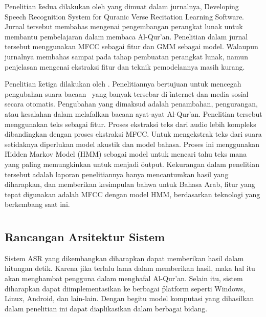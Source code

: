 Penelitian \f{kedua} dilakukan oleh \cite{putra2012developing} yang dimuat dalam jurnalnya, \f{Developing Speech Recognition System for Quranic Verse Recitation Learning Software}. Jurnal tersebut membahas mengenai pengembangan perangkat lunak untuk membantu pembelajaran dalam membaca Al-Qur'an. Penelitian dalam jurnal tersebut menggunakan MFCC sebagai fitur dan GMM sebagai model. Walaupun jurnalnya membahas sampai pada tahap pembuatan perangkat lunak, namun penjelasan mengenai ekstraksi fitur dan teknik pemodelannya masih kurang.

Penelitian \f{ketiga} dilakukan oleh \cite{mohammed2015quranic}. Penelitiannya bertujuan untuk mencegah pengubahan suara bacaan \quran~yang banyak tersebar di \f{internet} dan media sosial secara otomatis. Pengubahan yang dimaksud adalah penambahan, pengurangan, atau kesalahan dalam melafalkan bacaan ayat-ayat Al-Qur'an. Penelitian tersebut menggunakan teks sebagai fitur. Proses ekstraksi teks dari audio lebih kompleks dibandingkan dengan proses ekstraksi MFCC. Untuk mengekstrak teks dari suara setidaknya diperlukan model akustik dan model bahasa. Proses ini menggunakan \f{Hidden Markov Model} (HMM) sebagai model untuk mencari tahu teks mana yang paling memungkinkan untuk menjadi \f{output}. Kekurangan dalam penelitian tersebut adalah laporan penelitiannya hanya mencantumkan hasil yang diharapkan, dan memberikan kesimpulan bahwa untuk Bahasa Arab, fitur yang tepat digunakan adalah MFCC dengan model HMM, berdasarkan teknologi yang berkembang saat ini.%
\chapter{\babTiga}


\section{Rancangan Arsitektur Sistem}
Sistem ASR yang dikembangkan diharapkan dapat memberikan hasil dalam hitungan detik. Karena jika terlalu lama dalam memberikan hasil, maka hal itu akan menghambat pengguna dalam menghafal Al-Qur'an. Selain itu, sistem diharapkan dapat diimplementasikan ke berbagai \f{platform} seperti Windows, Linux, Android, dan lain-lain. Dengan begitu model komputasi yang dihasilkan dalam penelitian ini dapat diaplikasikan dalam berbagai bidang.

